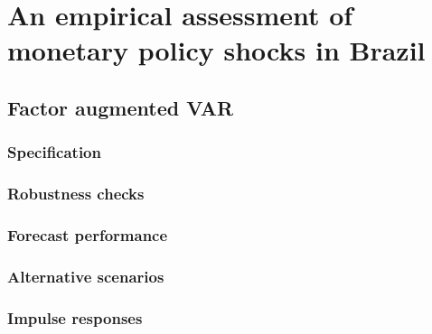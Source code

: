 \chapter{An empirical assessment of monetary policy shocks in Brazil}
    \lipsum[1]
    
    
    
    
    \section{Factor augmented VAR}
        \lipsum[1]
        \subsection{Specification}
            \lipsum[1]
        \subsection{Robustness checks}
            \lipsum[1]
        \subsection{Forecast performance}
            \lipsum[1]
        \subsection{Alternative scenarios}
            \lipsum[1]
        \subsection{Impulse responses}
            \lipsum[1]